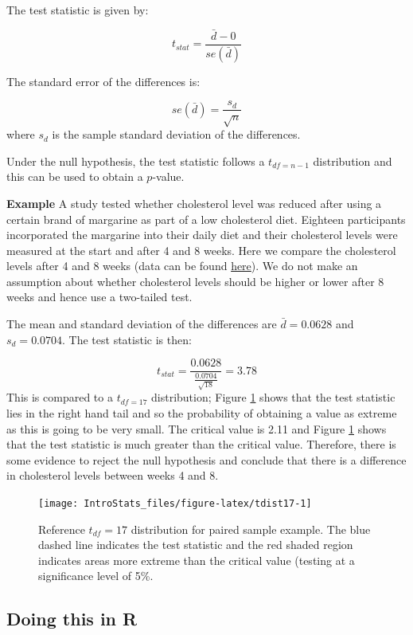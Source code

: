 \documentclass[
  oneside]{krantz}
\begin{document}
The test statistic is given by:

\[t_{stat} = \frac{\bar d - 0}{se(\bar d)} \]

The standard error of the differences is:

\[se(\bar d) = \frac{s_d}{\sqrt{n}}\]
where \(s_d\) is the sample standard deviation of the differences.

Under the null hypothesis, the test statistic follows a \(t_{df=n-1}\) distribution and this can be used to obtain a \(p\)-value.

\textbf{Example} A study tested whether cholesterol level was reduced after using a certain brand of margarine as part of a low cholesterol diet. Eighteen participants incorporated the margarine into their daily diet and their cholesterol levels were measured at the start and after 4 and 8 weeks. Here we compare the cholesterol levels after 4 and 8 weeks (data can be found \href{https://www.sheffield.ac.uk/mash/statistics/datasets}{here}). We do not make an assumption about whether cholesterol levels should be higher or lower after 8 weeks and hence use a two-tailed test.

The mean and standard deviation of the differences are \(\bar d = 0.0628\) and \(s_d = 0.0704\). The test statistic is then:

\[t_{stat} = \frac{0.0628}{\frac{0.0704}{\sqrt{18}}} = 3.78\]
This is compared to a \(t_{df=17}\) distribution; Figure \ref{fig:tdist17} shows that the test statistic lies in the right hand tail and so the probability of obtaining a value as extreme as this is going to be very small. The critical value is 2.11 and Figure \ref{fig:tdist17} shows that the test statistic is much greater than the critical value. Therefore, there is some evidence to reject the null hypothesis and conclude that there is a difference in cholesterol levels between weeks 4 and 8.

\begin{figure}[!htb]

{\centering \texttt{[image: IntroStats\_files/figure-latex/tdist17-1]} 

}

\caption{Reference $t_{df}=17$ distribution for paired sample example. The blue dashed line indicates the test statistic and the red shaded region indicates areas more extreme than the critical value (testing at a significance level of 5\%.}\label{fig:tdist17}
\end{figure}

\hypertarget{doing-this-in-r-14}{%
\subsection{Doing this in R}\label{doing-this-in-r-14}}
\end{document}
